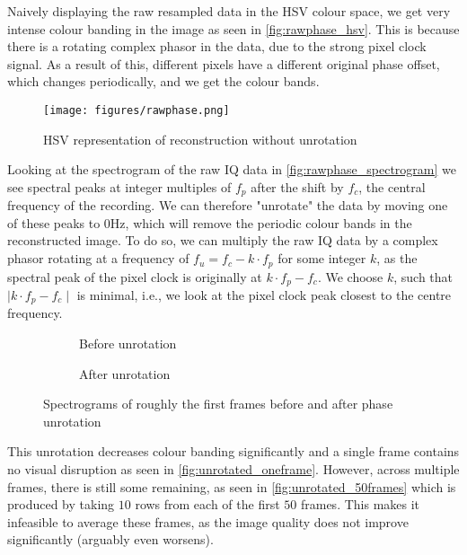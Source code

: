 \documentclass{article}
\begin{document}
Naively displaying the raw resampled data in the HSV colour space, we get very intense colour banding in the image as seen in \autoref{fig:rawphase_hsv}. This is because there is a rotating complex phasor in the data, due to the strong pixel clock signal. As a result of this, different pixels have a different original phase offset, which changes periodically, and we get the colour bands.

\begin{figure}[htb]
    \centering
    \texttt{[image: figures/rawphase.png]}
    \caption{HSV representation of reconstruction without unrotation}
    \label{fig:rawphase_hsv}
\end{figure}

Looking at the spectrogram of the raw IQ data in \autoref{fig:rawphase_spectrogram} we see spectral peaks at integer multiples of $f_p$ after the shift by $f_c$, the central frequency of the recording. We can therefore "unrotate" the data by moving one of these peaks to $0$Hz, which will remove the periodic colour bands in the reconstructed image. To do so, we can multiply the raw IQ data by a complex phasor rotating at a frequency of $f_u = f_c - k \cdot f_p$ for some integer $k$, as the spectral peak of the pixel clock is originally at $k \cdot f_p - f_c$. We choose $k$, such that $\mid k \cdot f_p - f_c \mid$ is minimal, i.e., we look at the pixel clock peak closest to the centre frequency.

\begin{figure}[htb]
\centering
\begin{subfigure}{.475\textwidth}
    \centering
    
    \caption{Before unrotation}
    \label{fig:rawphase_spectrogram}
\end{subfigure}
\hfill
\begin{subfigure}{.475\textwidth}
    \centering
    
    \caption{After unrotation}
    \label{fig:unrotated_spectrogram}
\end{subfigure}

\caption{Spectrograms of roughly the first frames before and after phase unrotation}
\label{fig:rawphase}
\end{figure}

This unrotation decreases colour banding significantly and a single frame contains no visual disruption as seen in \autoref{fig:unrotated_oneframe}. However, across multiple frames, there is still some remaining, as seen in \autoref{fig:unrotated_50frames} which is produced by taking $10$ rows from each of the first $50$ frames. This makes it infeasible to average these frames, as the image quality does not improve significantly (arguably even worsens).
\end{document}
